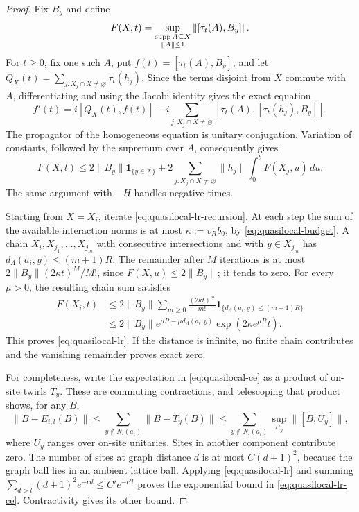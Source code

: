 \begin{proof}
Fix $B_y$ and define
\[
 F(X,t)=\sup_{\substack{\operatorname{supp} A\subseteq X\\\|A\|\le1}}
                 \|[\tau_t(A),B_y]\|.
\]
For $t\ge0$, fix one such $A$, put $f(t)=[\tau_t(A),B_y]$, and let
$Q_X(t)=\sum_{j:X_j\cap X\ne\varnothing}\tau_t(h_j)$.
Since the terms disjoint from $X$ commute with $A$, differentiating and
using the Jacobi identity gives the exact equation
\[
 f'(t)=i[Q_X(t),f(t)]
       -i\sum_{j:X_j\cap X\ne\varnothing}
            [\tau_t(A),[\tau_t(h_j),B_y]].
\]
The propagator of the homogeneous equation is unitary conjugation.  Variation
of constants, followed by the supremum over $A$, consequently gives
\begin{equation}
 F(X,t)\le 2\|B_y\|\mathbf1_{\{y\in X\}}
   +2\sum_{j:X_j\cap X\ne\varnothing}\|h_j\|
                 \int_0^t F(X_j,u)\,du.
 \label{eq:quasilocal-lr-recursion}
\end{equation}
The same argument with $-H$ handles negative times.

Starting from $X=X_i$, iterate \eqref{eq:quasilocal-lr-recursion}.
At each step the sum of the available interaction norms is at most
$\kappa:=v_Rb_0$, by \eqref{eq:quasilocal-budget}.  A chain
$X_i,X_{j_1},\ldots,X_{j_m}$ with consecutive intersections and with
$y\in X_{j_m}$ has
$d_\Lambda(a_i,y)\le(m+1)R$.  The remainder after $M$ iterations is at
most $2\|B_y\|(2\kappa t)^M/M!$, since $F(X,u)\le2\|B_y\|$;
it tends to zero.  For every $\mu>0$, the resulting chain sum satisfies
\begin{align*}
 F(X_i,t)
 &\le 2\|B_y\|\sum_{m\ge0}
      \frac{(2\kappa t)^m}{m!}
      \mathbf1_{\{d_\Lambda(a_i,y)\le(m+1)R\}}\\
 &\le 2\|B_y\|e^{\mu R-\mu d_\Lambda(a_i,y)}
                    \exp(2\kappa e^{\mu R}t).
\end{align*}
This proves \eqref{eq:quasilocal-lr}.  If the distance is infinite, no
finite chain contributes and the vanishing remainder proves exact zero.

For completeness, write the expectation in \eqref{eq:quasilocal-ce}
as a product of on-site twirls $T_y$.  These are commuting contractions,
and telescoping that product shows, for any $B$,
\[
 \|B-E_{i,l}(B)\|
 \le\sum_{y\notin N_l(a_i)}\|B-T_y(B)\|
 \le\sum_{y\notin N_l(a_i)}\sup_{U_y}\|[B,U_y]\|,
\]
where $U_y$ ranges over on-site unitaries.  Sites in another component
contribute zero.  The number of sites at graph distance $d$ is at most
$C(d+1)^2$, because the graph ball lies in an ambient lattice ball.
Applying \eqref{eq:quasilocal-lr} and summing
$\sum_{d>l}(d+1)^2e^{-cd}\le C'e^{-c'l}$ proves the exponential bound
in \eqref{eq:quasilocal-lr-ce}.  Contractivity gives its other bound.
\end{proof}

